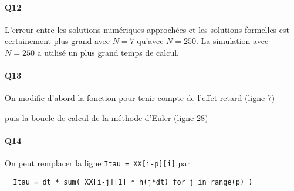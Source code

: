 \paragraph{Q12} L'erreur entre les solutions numériques approchées et les solutions formelles est certainement plus grand avec $N=7$ qu'avec $N=250$. La simulation avec $N=250$ a utilisé un plus grand temps de calcul.

\paragraph{Q13} On modifie d'abord la fonction pour tenir compte de l'effet retard (ligne 7)

puis la boucle de calcul de la méthode d'Euler (ligne 28)


\paragraph{Q14} On peut remplacer la ligne \texttt{Itau = XX[i-p][i]} par 
\begin{verbatim}
  Itau = dt * sum( XX[i-j][1] * h(j*dt) for j in range(p) )
\end{verbatim}
